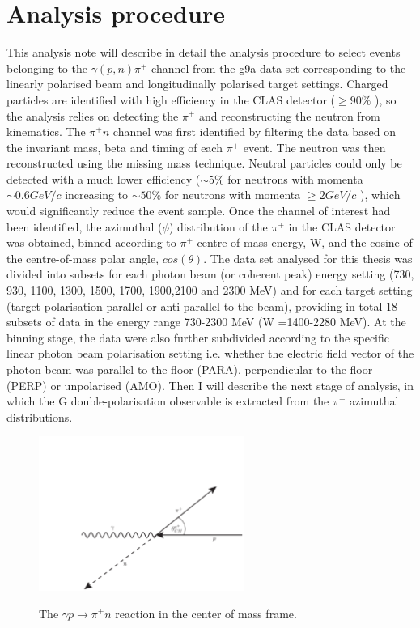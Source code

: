 \section{Analysis procedure}
This analysis note  will describe in detail the analysis procedure to select events belonging to the $\gamma (p,n) \pi^+$ channel from the g9a data set corresponding to the linearly polarised beam and longitudinally polarised target settings. Charged particles are identified with high efficiency in the CLAS detector ($\geq90\%$ \cite{Mecking2003}), so the analysis relies on detecting the $\pi^+$ and reconstructing the neutron from kinematics. The $\pi^+ n$ channel was first identified by filtering the data based on the invariant mass, beta and timing of each $\pi^+$ event. The neutron was then reconstructed using the missing mass technique. Neutral particles could only be detected with a much lower efficiency ($\sim5\%$ for neutrons with momenta $\sim 0.6 GeV/c$ increasing to $\sim 50\%$ for neutrons with momenta $\geq2 GeV/c$  \cite{Mecking2003}), which would significantly reduce the event sample. Once the channel of interest had been identified, the azimuthal ($\phi$) distribution of the $\pi^+$ in the CLAS detector was obtained, binned according to $\pi^+$ centre-of-mass energy, W, and the cosine of the centre-of-mass polar angle, $cos(\theta)$. The data set analysed for this thesis was divided into subsets for each photon beam (or coherent peak) energy setting (730, 930, 1100, 1300, 1500, 1700, 1900,2100 and 2300 MeV) and for each target setting (target polarisation parallel or anti-parallel to the beam), providing in total 18 subsets of data in the energy range 730-2300 MeV (W =1400-2280 MeV). At the binning stage, the data were  also further subdivided according to the specific linear photon beam polarisation setting i.e. whether the electric field vector of the photon beam was parallel to the floor (PARA), perpendicular to the floor (PERP) or unpolarised (AMO). Then I will describe the next stage of analysis, in which the G double-polarisation observable is extracted from the $\pi^+$ azimuthal distributions.
\begin{figure}[htb]
  \begin{center}
    \includegraphics[width=0.6\textwidth]{figures/frost_reaction.pdf} \\
    \caption{The $\gamma p \rightarrow \pi^+ n $ reaction in the center of mass frame. }
    \label{fig:frost_diagram}
  \end{center}
\end{figure}

